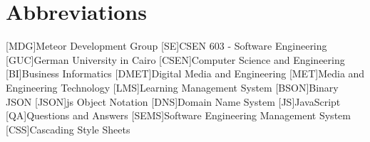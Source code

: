 \appendix
\renewcommand{\appendixtocname}{Appendix}
\renewcommand{\appendixpagename}{\appendixtocname}
\addappheadtotoc
{}
\appendixpage

\chapter{Abbreviations}

\begin{acronym}[\hspace{3cm}]
  [MDG]{Meteor Development Group}
  [SE]{CSEN 603 - Software Engineering}
  [GUC]{German University in Cairo}
  [CSEN]{Computer Science and Engineering}
  [BI]{Business Informatics}
  [DMET]{Digital Media and Engineering}
  [MET]{Media and Engineering Technology \cite{metportal}}
  [LMS]{Learning Management System}
  [BSON]{Binary JSON}
  [JSON]{\ac{js} Object Notation}
  [DNS]{Domain Name System}
  [JS]{JavaScript}
  [QA]{Questions and Answers}
  [SEMS]{Software Engineering Management System}
  [CSS]{Cascading Style Sheets}
\end{acronym}

\clearpage
\listoffigures
{}
